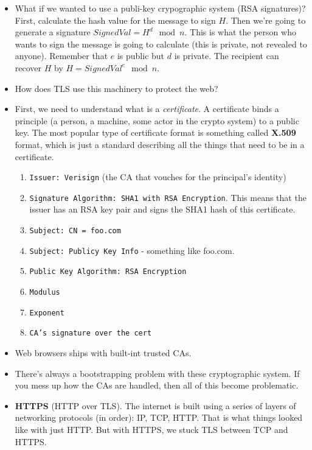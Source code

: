 \documentclass[12pt]{article}
\theoremstyle{definition}
\begin{document}
\begin{itemize}
    \item What if we wanted to use a publi-key crypographic system (RSA signatures)? First, calculate the hash value for the message to sign $H$. Then we're going to generate a signature $SignedVal = H^d \mod n$. This is what the person who wants to sign the message is going to calculate (this is private, not revealed to anyone). Remember that $e$ is public but $d$ is private. The recipient can recover $H$ by $H = SignedVal^e \mod n$.
    \item How does TLS use this machinery to protect the web?
    \item First, we need to understand what is a \textit{certificate}.  A certificate binds a principle (a person, a machine, some actor in the crypto system) to a public key. The most popular type of certificate format is something called \textbf{X.509} format, which is just a standard describing all the things that need to be in a certificate.
        \begin{enumerate}
            \itemsep0em 
            \item \texttt{Issuer: Verisign} (the CA that vouches for the principal's identity)
            \item \texttt{Signature Algorithm: SHA1 with RSA Encryption}. This means that the issuer has an RSA key pair  and signs the SHA1 hash of this certificate.
            \item \texttt{Subject: CN = foo.com} 
            \item \texttt{Subject: Publicy Key Info} - something like foo.com.
            \item \texttt{Public Key Algorithm: RSA Encryption}
            \item \texttt{Modulus}
            \item \texttt{Exponent}
            \item \texttt{CA's signature over the cert}
        \end{enumerate}
    \item Web browsers ships with built-int trusted CAs.
    \item There's always a bootstrapping problem with these cryptographic system. If you mess up how the CAs are handled, then all of this become problematic.
    \item \textbf{HTTPS} (HTTP over TLS). The internet is built using a series of layers of networking protocols (in order): IP, TCP, HTTP. That is what things looked like with just HTTP. But with HTTPS, we stuck TLS between TCP and HTTPS.

\end{itemize}
\end{document}
